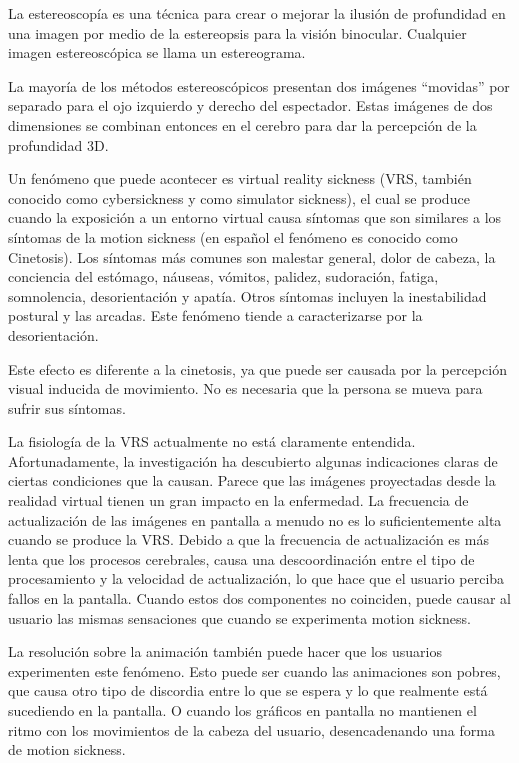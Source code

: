\documentclass[12pt]{article}
\begin{document}
La estereoscopía es una técnica para crear o mejorar la ilusión de profundidad en una imagen por medio de la estereopsis para la visión binocular. Cualquier imagen estereoscópica se llama un estereograma. 

La mayoría de los métodos estereoscópicos presentan  dos imágenes “movidas” por separado para el ojo izquierdo y derecho del espectador. Estas imágenes de dos dimensiones se combinan entonces en el cerebro para dar la percepción de la profundidad 3D.

Un fenómeno que puede acontecer es virtual reality sickness (VRS, también conocido como cybersickness y como simulator sickness), el cual se produce cuando la exposición a un entorno virtual causa síntomas que son similares a los síntomas de la motion sickness\cite{VRS} (en español el fenómeno es conocido como Cinetosis). Los síntomas más comunes son malestar general, dolor de cabeza, la conciencia del estómago, náuseas, vómitos, palidez, sudoración, fatiga, somnolencia, desorientación y apatía. Otros síntomas incluyen la inestabilidad postural y las arcadas. Este fenómeno tiende a caracterizarse por la desorientación.

Este efecto es diferente a la cinetosis, ya que puede ser causada por la percepción visual inducida de movimiento. No es necesaria que la persona se mueva para sufrir sus síntomas.

La fisiología de la VRS actualmente no está claramente entendida. Afortunadamente, la investigación ha descubierto algunas indicaciones claras de ciertas condiciones que la causan. Parece que las imágenes proyectadas desde la realidad virtual tienen un gran impacto en la enfermedad. La frecuencia de actualización de las imágenes en pantalla a menudo no es lo suficientemente alta cuando se produce la VRS. Debido a que la frecuencia de actualización es más lenta que los procesos cerebrales, causa una descoordinación entre el tipo de procesamiento y la velocidad de actualización, lo que hace que el usuario perciba fallos en la pantalla. Cuando estos dos componentes no coinciden, puede causar al usuario las mismas sensaciones que cuando se experimenta motion sickness.

La resolución sobre la animación también puede hacer que los usuarios experimenten este fenómeno\cite{oculussickness}. Esto puede ser cuando las animaciones son pobres, que  causa otro tipo de discordia entre lo que se espera y lo que realmente está sucediendo en la pantalla. O cuando los gráficos en pantalla no mantienen el ritmo con los movimientos de la cabeza del usuario, desencadenando una forma de motion sickness.
\end{document}
